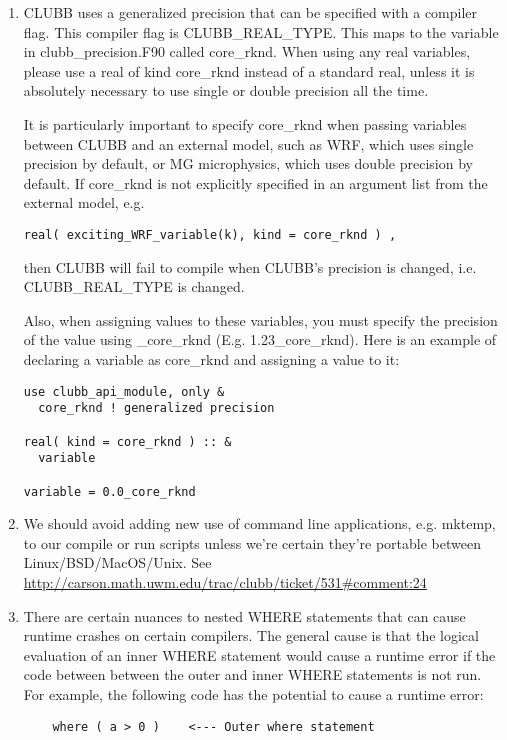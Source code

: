 \documentclass[letterpaper,12pt]{article}
\begin{document}
\begin{enumerate}
\item CLUBB uses a generalized precision that can be specified with a compiler flag. This compiler flag is CLUBB\_REAL\_TYPE. This maps to the variable in clubb\_precision.F90 called core\_rknd. When using any real variables, please use a real of kind core\_rknd instead of a standard real, unless it is absolutely necessary to use single or double precision all the time. 

It is particularly important to specify core\_rknd when passing variables between CLUBB and an external model, such as WRF, which uses single precision by default, or MG microphysics, which uses double precision by default.  If core\_rknd is not explicitly specified in an argument list from the external model, e.g.

\begin{verbatim}
real( exciting_WRF_variable(k), kind = core_rknd ) ,
\end{verbatim}

then CLUBB will fail to compile when CLUBB's precision is changed, i.e. CLUBB\_REAL\_TYPE is changed.

Also, when assigning values to these variables, you must specify the precision of the value using \_core\_rknd (E.g. 1.23\_core\_rknd). Here is an example of declaring a variable as core\_rknd and assigning a value to it:

\begin{verbatim}
use clubb_api_module, only &
  core_rknd ! generalized precision

real( kind = core_rknd ) :: &
  variable

variable = 0.0_core_rknd
\end{verbatim}

\item
We should avoid adding new use of command line applications, e.g. mktemp, to our compile or run scripts unless we're certain they're portable between Linux/BSD/MacOS/Unix.  See \url{http://carson.math.uwm.edu/trac/clubb/ticket/531#comment:24}

\item
There are certain nuances to nested WHERE statements that can cause runtime crashes on certain compilers. The general cause is that the logical evaluation of an inner WHERE statement would cause a runtime error if the code between between the outer and inner WHERE statements is not run. For example, the following code has the potential to cause a runtime error:

\begin{verbatim}
    where ( a > 0 )    <--- Outer where statement 


\end{verbatim}
\end{enumerate}
\end{document}
